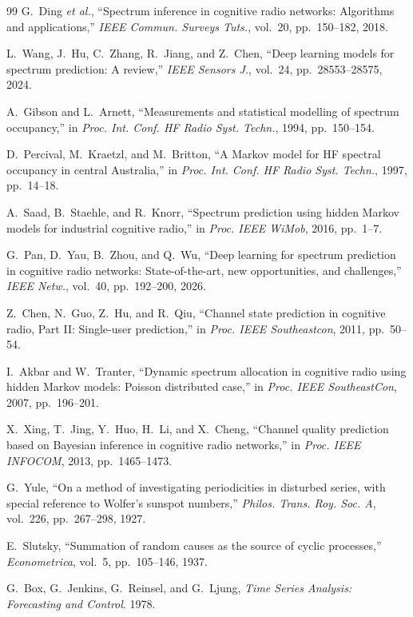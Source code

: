 \documentclass[lettersize,journal]{IEEEtran}
\begin{document}
\begin{thebibliography}{99}
 G.~Ding \emph{et al.}, ``Spectrum inference in cognitive radio networks: Algorithms and applications,'' \emph{IEEE Commun. Surveys Tuts.}, vol.~20, pp.~150--182, 2018.

 L.~Wang, J.~Hu, C.~Zhang, R.~Jiang, and Z.~Chen, ``Deep learning models for spectrum prediction: A review,'' \emph{IEEE Sensors J.}, vol.~24, pp.~28553--28575, 2024.

 A.~Gibson and L.~Arnett, ``Measurements and statistical modelling of spectrum occupancy,'' in \emph{Proc. Int. Conf. HF Radio Syst. Techn.}, 1994, pp.~150--154.

 D.~Percival, M.~Kraetzl, and M.~Britton, ``A Markov model for HF spectral occupancy in central Australia,'' in \emph{Proc. Int. Conf. HF Radio Syst. Techn.}, 1997, pp.~14--18.

 A.~Saad, B.~Staehle, and R.~Knorr, ``Spectrum prediction using hidden Markov models for industrial cognitive radio,'' in \emph{Proc. IEEE WiMob}, 2016, pp.~1--7.

 G.~Pan, D.~Yau, B.~Zhou, and Q.~Wu, ``Deep learning for spectrum prediction in cognitive radio networks: State-of-the-art, new opportunities, and challenges,'' \emph{IEEE Netw.}, vol.~40, pp.~192--200, 2026.

 Z.~Chen, N.~Guo, Z.~Hu, and R.~Qiu, ``Channel state prediction in cognitive radio, Part II: Single-user prediction,'' in \emph{Proc. IEEE Southeastcon}, 2011, pp.~50--54.

 I.~Akbar and W.~Tranter, ``Dynamic spectrum allocation in cognitive radio using hidden Markov models: Poisson distributed case,'' in \emph{Proc. IEEE SoutheastCon}, 2007, pp.~196--201.

 X.~Xing, T.~Jing, Y.~Huo, H.~Li, and X.~Cheng, ``Channel quality prediction based on Bayesian inference in cognitive radio networks,'' in \emph{Proc. IEEE INFOCOM}, 2013, pp.~1465--1473.

 G.~Yule, ``On a method of investigating periodicities in disturbed series, with special reference to Wolfer's sunspot numbers,'' \emph{Philos. Trans. Roy. Soc. A}, vol.~226, pp.~267--298, 1927.

 E.~Slutsky, ``Summation of random causes as the source of cyclic processes,'' \emph{Econometrica}, vol.~5, pp.~105--146, 1937.

 G.~Box, G.~Jenkins, G.~Reinsel, and G.~Ljung, \emph{Time Series Analysis: Forecasting and Control}. 1978.


\end{thebibliography}
\end{document}
